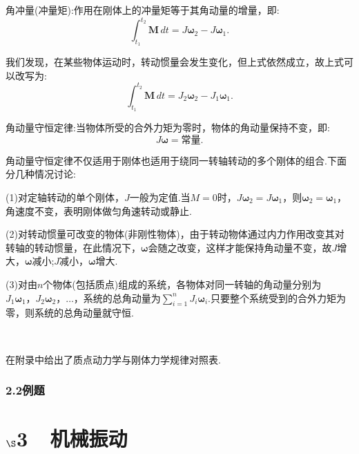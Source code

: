 \documentclass[UTF8]{ctexart}
\begin{document}
	角冲量(冲量矩):作用在刚体上的冲量矩等于其角动量的增量，即:
	\begin{equation*}
		\int_{t_1}^{t_2}{\boldsymbol M} \,dt=J{\boldsymbol \omega}_2-J{\boldsymbol \omega}_1.
	\end{equation*}

	我们发现，在某些物体运动时，转动惯量会发生变化，但上式依然成立，故上式可以改写为:
	\begin{equation*}
		\int_{t_1}^{t_2}{\boldsymbol M} \,dt=J_2{\boldsymbol \omega}_2-J_1{\boldsymbol \omega}_1.
	\end{equation*}

	角动量守恒定律:当物体所受的合外力矩为零时，物体的角动量保持不变，即:
	\begin{equation*}
		J{\boldsymbol \omega}=\text{常量}.
	\end{equation*}

	角动量守恒定律不仅适用于刚体也适用于绕同一转轴转动的多个刚体的组合.下面分几种情况讨论:

	(1)对定轴转动的单个刚体，$J$一般为定值.当$M=0$时，$J{\boldsymbol \omega}_2=J{\boldsymbol \omega}_1$，则${\boldsymbol \omega}_2={\boldsymbol \omega}_1$，角速度不变，表明刚体做匀角速转动或静止.

	(2)对转动惯量可改变的物体(非刚性物体)，由于转动物体通过内力作用改变其对转轴的转动惯量，在此情况下，${\boldsymbol \omega}$会随之改变，这样才能保持角动量不变，故$J$增大，${\boldsymbol \omega}$减小;$J$减小，${\boldsymbol \omega}$增大.

	(3)对由$n$个物体(包括质点)组成的系统，各物体对同一转轴的角动量分别为$J_1{\boldsymbol \omega}_1\text{，}J_2{\boldsymbol \omega}_2\text{，}\dots$，系统的总角动量为$\sum_{i=1}^{n}J_i{\boldsymbol \omega}_i$.只要整个系统受到的合外力矩为零，则系统的总角动量就守恒.
	
	~
	
	在附录中给出了质点动力学与刚体力学规律对照表.
	\subsubsection*{2.2例题}

\newpage
	\section*{$\S$3~~机械振动}
\end{document}
